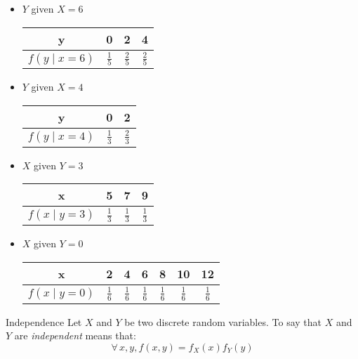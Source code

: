 \documentclass[letterpaper,12pt,fleqn]{article}
\newcommand{\cp}[3]{#1\left(#2\mathbin{\vert}#3\right)}
\begin{document}
\begin{example}
  \begin{itemize}
  \item \(Y\) given \(X=6\)

    \begin{tabular}{c|ccc}
      \hline
      y & 0 & 2 & 4 \\
      \hline
      \(\cp{f}{y}{x=6}\) & \(\frac{1}{5}\) & \(\frac{2}{5}\) & \(\frac{2}{5}\) \\
      \hline
    \end{tabular}

    \bigskip
    
  \item \(Y\) given \(X=4\)

    \begin{tabular}{c|cc}
      \hline
      y & 0 & 2 \\
      \hline
      \(\cp{f}{y}{x=4}\) & \(\frac{1}{3}\) & \(\frac{2}{3}\) \\
      \hline
    \end{tabular}

    \bigskip
    
  \item \(X\) given \(Y=3\)

    \begin{tabular}{c|ccc}
      \hline
      x & 5 & 7 & 9 \\
      \hline
      \(\cp{f}{x}{y=3}\) & \(\frac{1}{3}\) & \(\frac{1}{3}\) & \(\frac{1}{3}\) \\
      \hline
    \end{tabular}

    \bigskip
    
  \item \(X\) given \(Y=0\)

    \begin{tabular}{c|cccccc}
      \hline
      x & 2 & 4 & 6 & 8 & 10 & 12 \\
      \hline
      \(\cp{f}{x}{y=0}\) & \(\frac{1}{6}\) & \(\frac{1}{6}\) & \(\frac{1}{6}\) & \(\frac{1}{6}\) & \(\frac{1}{6}\) &
      \(\frac{1}{6}\) \\
      \hline
    \end{tabular}

    \bigskip
  \end{itemize}
\end{example}

\begin{definition}{Independence}
  Let \(X\) and \(Y\) be two discrete random variables.  To say that \(X\) and \(Y\) are \emph{independent} means that:
  \[\forall\,x,y,f(x,y)=f_X(x)f_Y(y)\]
\end{definition}
\end{document}
